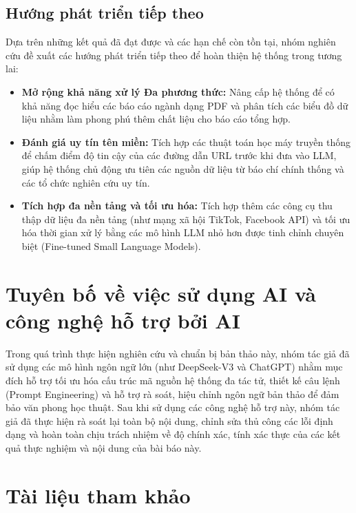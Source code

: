 \documentclass[11pt,a4paper]{article}
\begin{document}
\begin{itemize}
\subsection{Hướng phát triển tiếp theo}
Dựa trên những kết quả đã đạt được và các hạn chế còn tồn tại, nhóm nghiên cứu đề xuất các hướng phát triển tiếp theo để hoàn thiện hệ thống trong tương lai:
\begin{itemize}
    \item \textbf{Mở rộng khả năng xử lý Đa phương thức:} Nâng cấp hệ thống để có khả năng đọc hiểu các báo cáo ngành dạng PDF và phân tích các biểu đồ dữ liệu nhằm làm phong phú thêm chất liệu cho báo cáo tổng hợp.
    \item \textbf{Đánh giá uy tín tên miền:} Tích hợp các thuật toán học máy truyền thống để chấm điểm độ tin cậy của các đường dẫn URL trước khi đưa vào LLM, giúp hệ thống chủ động ưu tiên các nguồn dữ liệu từ báo chí chính thống và các tổ chức nghiên cứu uy tín.
    \item \textbf{Tích hợp đa nền tảng và tối ưu hóa:} Tích hợp thêm các công cụ thu thập dữ liệu đa nền tảng (như mạng xã hội TikTok, Facebook API) và tối ưu hóa thời gian xử lý bằng các mô hình LLM nhỏ hơn được tinh chỉnh chuyên biệt (Fine-tuned Small Language Models).
\end{itemize}

\section*{Tuyên bố về việc sử dụng AI và công nghệ hỗ trợ bởi AI}
Trong quá trình thực hiện nghiên cứu và chuẩn bị bản thảo này, nhóm tác giả đã sử dụng các mô hình ngôn ngữ lớn (như DeepSeek-V3 và ChatGPT) nhằm mục đích hỗ trợ tối ưu hóa cấu trúc mã nguồn hệ thống đa tác tử, thiết kế câu lệnh (Prompt Engineering) và hỗ trợ rà soát, hiệu chỉnh ngôn ngữ bản thảo để đảm bảo văn phong học thuật. Sau khi sử dụng các công nghệ hỗ trợ này, nhóm tác giả đã thực hiện rà soát lại toàn bộ nội dung, chỉnh sửa thủ công các lỗi định dạng và hoàn toàn chịu trách nhiệm về độ chính xác, tính xác thực của các kết quả thực nghiệm và nội dung của bài báo này.

\section*{Tài liệu tham khảo}



\end{itemize}
\end{document}
